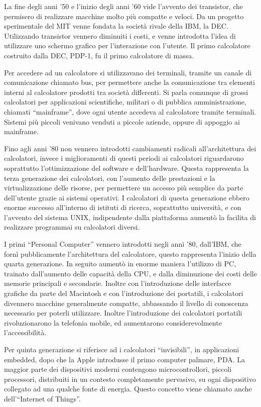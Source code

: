 \documentclass{article}
\numberwithin{equation}{subsection}
\begin{document}
La fine degli anni '50 e l'inizio degli anni '60 vide l'avvento dei transistor, che permisero di realizzare macchine molto più compatte e veloci. Da un progetto sperimentale del MIT venne fondata la società 
rivale della IBM, la DEC. Utilizzando transistor vennero diminuiti i costi, e venne introdotta l'idea di utilizzare uno schermo grafico 
per l'interazione con l'utente. Il primo calcolatore costruito dalla DEC, PDP-1, fu il primo calcolatore di massa. 


Per accedere ad un calcolatore si utilizzavano dei terminali, tramite un canale di comunicazione chiamato bus, per permettere anche la comunicazione tra elementi interni al 
calcolatore prodotti tra società differenti. 
Si parla comunque di grossi calcolatori per applicazioni scientifiche, militari o di pubblica amministrazione, chiamati ``mainframe'', dove ogni utente accedeva al calcolatore 
tramite terminali. Sistemi più piccoli venivano venduti a piccole aziende, oppure di appoggio ai mainframe. 


Fino agli anni '80 non vennero introdotti cambiamenti radicali all'architettura dei calcolatori, invece i miglioramenti di questi periodi ai calcolatori riguardarono soprattutto 
l'ottimizzazione del software e dell'hardware. Questa rappresenta la terza generazione dei calcolatori, con l'aumento delle prestazioni e la virtualizzazione delle risorse, per permettere un accesso più semplice 
da parte dell'utente grazie ai sistemi operativi. 
I calcolatori di questa generazione ebbero enorme successo all'interno di istituti di ricerca, soprattutto università, e con l'avvento del sistema UNIX, indipendente dalla piattaforma aumentò la facilita di 
realizzare programmai su calcolatori diversi. 


I primi ``Personal Computer'' vennero introdotti negli anni '80, dall'IBM, che fornì pubblicamente l'architettura del calcolatore, questo rappresenta l'inizio della quarta generazione. In seguito aumentò in enorme 
maniera l'utilizzo di PC, trainato dall'aumento delle capacità della CPU, e dalla diminuzione dei costi delle memorie principali e secondarie. Inoltre con l'introduzione delle interfacce grafiche da parte 
del Macintosh e con l'introduzione dei portatili, i calcolatori divennero macchine generalmente compatte, abbassando il livello di conoscenza necessario per poterli utilizzare. 
Inoltre l'introduzione dei calcolatori portatili rivoluzionarono la telefonia mobile, ed aumentarono considerevolmente l'accessibilità. 


Per quinta generazione si riferisce ad i calcolatori ``invisibili'', in applicazioni embedded, dopo che la Apple introdusse il primo computer palmare, PDA. 
La maggior parte dei dispositivi moderni contengono microcontrollori, piccoli processori, distribuiti in un contesto completamente pervasivo, su ogni dispositivo collegato 
ad una qualche fonte di energia. Questo concetto viene chiamato anche dell'``Internet of Things''.  
\end{document}
